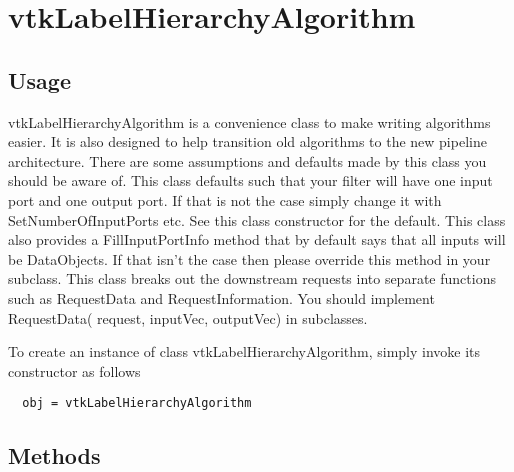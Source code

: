 \section{vtkLabelHierarchyAlgorithm}

\subsection{Usage}


 vtkLabelHierarchyAlgorithm is a convenience class to make writing algorithms
 easier. It is also designed to help transition old algorithms to the new
 pipeline architecture. There are some assumptions and defaults made by this
 class you should be aware of. This class defaults such that your filter
 will have one input port and one output port. If that is not the case
 simply change it with SetNumberOfInputPorts etc. See this class
 constructor for the default. This class also provides a FillInputPortInfo
 method that by default says that all inputs will be DataObjects. If that
 isn't the case then please override this method in your subclass. This
 class breaks out the downstream requests into separate functions such as
 RequestData and RequestInformation.  You should
 implement RequestData( request, inputVec, outputVec) in subclasses.

To create an instance of class vtkLabelHierarchyAlgorithm, simply
invoke its constructor as follows
\begin{verbatim}
  obj = vtkLabelHierarchyAlgorithm
\end{verbatim}
\subsection{Methods}

